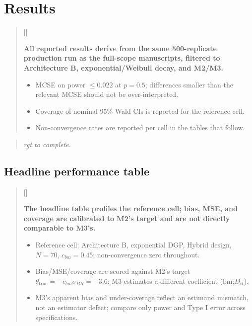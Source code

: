 \documentclass[
  11pt,
]{article}
\newcounter{pgraph}
\newenvironment{bullets}{%
  \stepcounter{pgraph}%
  \begin{quote}\small\sffamily\color[gray]{0.30}%
  {\normalfont\scriptsize\color[gray]{0.58}[\thepgraph]\enspace}}{%
  \end{quote}}
\newenvironment{rgt}{%
  \begin{quote}\small\itshape\color[RGB]{20,60,160}}{%
  \end{quote}}
\begin{document}
\section{Results}\label{results}

\begin{bullets}

\textbf{All reported results derive from the same 500-replicate
production run as the full-scope manuscripts, filtered to
Architecture B, exponential/Weibull decay, and M2/M3.}

\begin{itemize}\setlength{\itemsep}{2pt}\setlength{\parskip}{0pt}
\item MCSE on power $\leq 0.022$ at $p = 0.5$; differences smaller
than the relevant MCSE should not be over-interpreted.
\item Coverage of nominal 95\% Wald CIs is reported for the reference
cell.
\item Non-convergence rates are reported per cell in the tables that
follow.
\end{itemize}

\end{bullets}

\begin{rgt}
rgt to complete.

\end{rgt}

\subsection{Headline performance table}\label{sec-headline}

\begin{bullets}

\textbf{The headline table profiles the reference cell; bias, MSE,
and coverage are calibrated to M2's target and are not directly
comparable to M3's.}

\begin{itemize}\setlength{\itemsep}{2pt}\setlength{\parskip}{0pt}
\item Reference cell: Architecture B, exponential DGP, Hybrid design,
$N = 70$, $c_{bm} = 0.45$; non-convergence zero throughout.
\item Bias/MSE/coverage are scored against M2's target
$\theta_{\text{true}} = -c_{bm}\sigma_{BR} = -3.6$; M3 estimates a
different coefficient ($\text{bm:}D_{it}$).
\item M3's apparent bias and under-coverage reflect an estimand
mismatch, not an estimator defect; compare only power and Type I
error across specifications.
\end{itemize}

\end{bullets}
\end{document}

